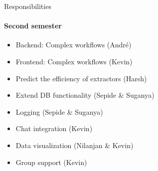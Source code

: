 \begin{frame}{Responsibilities}
\framesubtitle{Second semester}
	\begin{itemize}
		\item Backend: Complex workflows (André)
		\item Frontend: Complex workflows (Kevin)
		\item Predict the efficiency of extractors (Harsh)
		\item Extend DB functionality (Sepide \& Suganya)
		\item Logging (Sepide \& Suganya)
		\item Chat integration (Kevin)
		\item Data visualization (Nilanjan \& Kevin)
		\item Group support (Kevin)
	\end{itemize}
\end{frame}